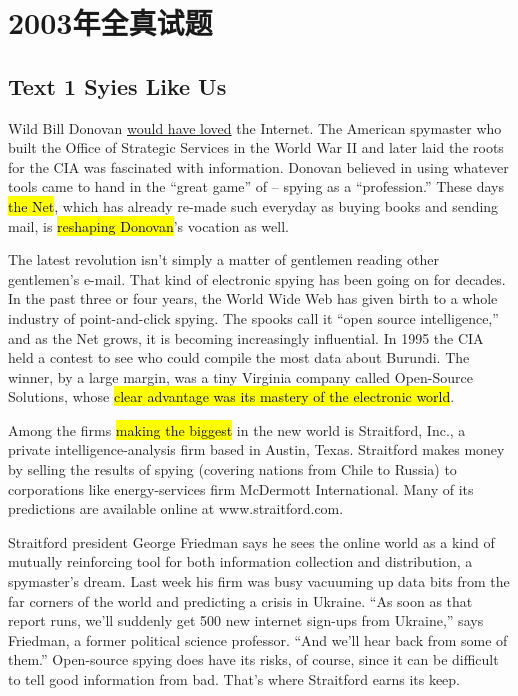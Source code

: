 \section{2003年全真试题}
\subsection{Text 1 Syies Like Us}
Wild Bill Donovan \ul{would have loved} the Internet. The American spymaster who built the Office of Strategic Services in the World War II and later laid the roots for the CIA was fascinated with information. 
Donovan believed in using whatever tools came to hand in the “great game” of 
 -- spying as a “profession.” These days 
\hl{the Net}, which has already re-made such everyday 
 as buying books and sending mail, is 
\hl{reshaping Donovan}’s 
vocation as well.

The latest revolution isn’t simply a matter of gentlemen reading other gentlemen’s e-mail. That kind of electronic spying has been going on for decades. In the past three or four years, the World Wide Web has given birth to a whole industry of point-and-click spying. The spooks call it “open source intelligence,” and as the Net grows, it is becoming increasingly influential. In 1995 the CIA held a contest to see who could compile the most data about Burundi. The winner, by a large margin, was a tiny Virginia company called Open-Source Solutions, whose 
\hl{clear advantage was its mastery of the electronic world}.

Among the firms \hl{making the biggest} 
in the new world is Straitford, Inc., a private 
intelligence-analysis firm based in Austin, Texas. Straitford makes money by selling the results of spying (covering nations from Chile to Russia) to corporations like energy-services firm McDermott International. Many of its predictions are available online at www.straitford.com.

Straitford president George Friedman says he sees the online world as a kind of 
mutually reinforcing tool for both information collection and distribution, a spymaster’s dream. Last week his firm was busy vacuuming up data bits from the far corners of the world and predicting a crisis in Ukraine. “As soon as that report runs, we’ll suddenly get 500 new internet sign-ups from Ukraine,” says Friedman, a former political science professor. “And we’ll hear back from some of them.” Open-source spying does have its risks, of course, since it can be difficult to tell good information from bad. That’s where Straitford earns its keep.

